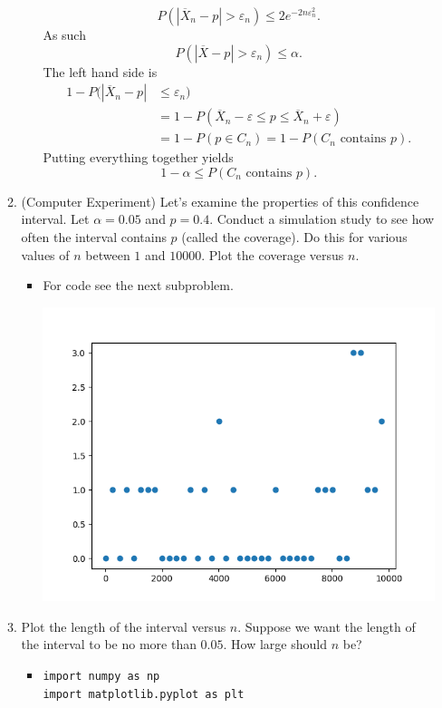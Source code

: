 \documentclass{article}
\begin{document}
\begin{enumerate}
\begin{enumerate}
\begin{itemize}
$$					P(|\overline{X}_n - p| > \varepsilon_n) \leq 2e^{-2n \varepsilon_n^2}.
					$$
					As such
					$$
					P(|\overline{X} - p| > \varepsilon_n) \leq \alpha.
					$$
					The left hand side is
					$$
					\begin{aligned}
					1 - P(|\overline{X}_n - p| &\leq \varepsilon_n) \\
					&= 1 - P(\overline{X}_n - \varepsilon \leq p \leq \overline{X}_n + \varepsilon) \\
					&= 1 - P(p \in C_n) = 1 - P(C_n\text{ contains }p).
					\end{aligned}
					$$
					Putting everything together yields
					$$
					1 - \alpha \leq P(C_n\text{ contains }p).
					$$
				\end{itemize}
			\item (Computer Experiment) Let's examine the properties of this confidence interval. Let $\alpha = 0.05$ and $p = 0.4$. Conduct a simulation study to see how often the interval contains $p$ (called the coverage). Do this for various values of $n$ between $1$ and $10000$. Plot the coverage versus $n$.
			\begin{itemize}
				\item For code see the next subproblem.
				\begin{center}
					\includegraphics[width=\linewidth]{4-Probability_Inequalities/Ex4_4b.png}
				\end{center}
			\end{itemize}
			\item Plot the length of the interval versus $n$. Suppose we want the length of the interval to be no more than $0.05$. How large should $n$ be?
				\begin{itemize}
					\item 
					\begin{verbatim}
import numpy as np
import matplotlib.pyplot as plt


\end{verbatim}
\end{itemize}
\end{enumerate}
\end{enumerate}
\end{document}
